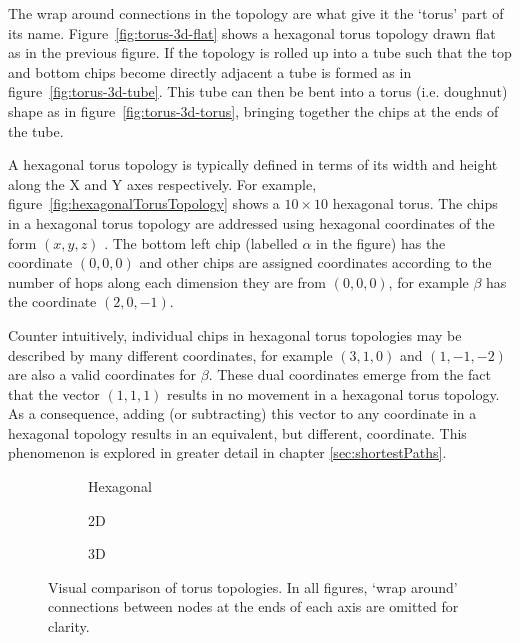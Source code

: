 		The wrap around connections in the topology are what give it the `torus'
		part of its name. Figure~\ref{fig:torus-3d-flat} shows a hexagonal torus
		topology drawn flat as in the previous figure. If the topology is rolled
		up into a tube such that the top and bottom chips become directly
		adjacent a tube is formed as in figure~\ref{fig:torus-3d-tube}. This tube
		can then be bent into a torus (i.e. doughnut) shape as in
		figure~\ref{fig:torus-3d-torus}, bringing together the chips at the ends
		of the tube.
		
		A hexagonal torus topology is typically defined in terms of its width and
		height along the X and Y axes respectively. For example,
		figure~\ref{fig:hexagonalTorusTopology} shows a $10\times10$ hexagonal
		torus.  The chips in a hexagonal torus topology are addressed using
		hexagonal coordinates of the form $(x, y, z)$ \cite{patel15}. The bottom
		left chip (labelled $\alpha$ in the figure) has the coordinate $(0, 0, 0)$
		and other chips are assigned coordinates according to the number of hops
		along each dimension they are from $(0, 0, 0)$, for example $\beta$ has the
		coordinate $(2, 0, -1)$.
		
		Counter intuitively, individual chips in hexagonal torus topologies may be
		described by many different coordinates, for example $(3, 1, 0)$ and $(1,
		-1, -2)$ are also a valid coordinates for $\beta$. These dual coordinates
		emerge from the fact that the vector $(1, 1, 1)$ results in no movement in
		a hexagonal torus topology. As a consequence, adding (or subtracting) this
		vector to any coordinate in a hexagonal topology results in an equivalent,
		but different, coordinate. This phenomenon is explored in greater detail in
		chapter \ref{sec:shortestPaths}.
		
		\begin{figure}
			\center
			\begin{subfigure}[b]{0.32\linewidth}
				\center
				
				\caption{Hexagonal}
				\label{fig:torus-compare-hexagonal}
			\end{subfigure}
			\begin{subfigure}[b]{0.32\linewidth}
				\center
				
				\caption{2D}
				\label{fig:torus-compare-2d}
			\end{subfigure}
			\begin{subfigure}[b]{0.32\linewidth}
				\center
				
				\caption{3D}
				\label{fig:torus-compare-3d}
			\end{subfigure}
			
			\caption{Visual comparison of torus topologies. In all figures, `wrap
			around' connections between nodes at the ends of each axis are omitted
			for clarity.}
			\label{fig:torus-compare}
		\end{figure}
		
